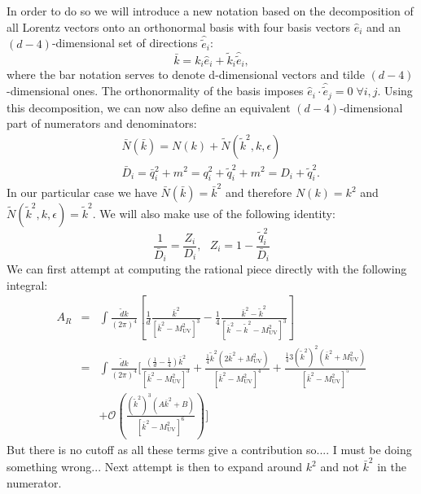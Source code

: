 \documentclass[11pt]{article}
\begin{document}
In order to do so we will introduce a new notation based on the decomposition of all Lorentz vectors onto an orthonormal basis with four basis vectors $\hat{e}_i$ and an $(d-4)$-dimensional set of directions $\hat{\tilde{e}}_i$:
\begin{equation}
\bar{k} = k_i \hat{e}_i + \tilde{k}_i \hat{\tilde{e}}_i,
\end{equation}
where the bar notation serves to denote d-dimensional vectors and tilde $(d-4)$-dimensional ones. 
The orthonormality of the basis imposes $\hat{e}_i \cdot \hat{\tilde{e}}_j = 0\; \forall i,j$.
Using this decomposition, we can now also define an equivalent $(d-4)$-dimensional part of numerators and denominators:
\begin{eqnarray}
&&\bar{N}(\bar{k})=N(k)+\tilde{N}(\tilde{k}^2,k,\epsilon) \nonumber\\
&&\bar{D}_i = \bar{q}_i^2+m^2 = q_i^2+\tilde{q}_i^2+m^2 = D_i + \tilde{q}_i^2.
\end{eqnarray}
In our particular case we have $\bar{N}(\bar{k})=\bar{k}^2$ and therefore $N(k)=k^2$ and $\tilde{N}(\tilde{k}^2,k,\epsilon)=\tilde{k}^2$.
We will also make use of the following identity:
\begin{equation}
\frac{1}{\bar{D}_i}=\frac{Z_i}{D_i},\textrm{  } Z_i=1-\frac{\tilde{q}_i^2}{\bar{D}_i}
\end{equation}
We can first attempt at computing the rational piece directly with the following integral:
\begin{eqnarray}
A_{R} &=& \int \frac{\tilde{d} k}{(2\pi)^4} \left [
\frac{1}{d} \frac{ \bar{k}^2 }{\left[ \bar{k}^2-M_\textrm{UV}^2\right]^3}
-\frac{1}{4} \frac{ \bar{k}^2-\tilde{k}^2  }{\left[ \bar{k}^2-\tilde{k}^2-M_\textrm{UV}^2\right]^3}
\right] \nonumber\\
&=& \int \frac{\tilde{d} k}{(2\pi)^4}
{\Big[} 
\frac{\left(\frac{1}{d}-\frac{1}{4}\right)\bar{k}^2}
{\left[ \bar{k}^2-M_\textrm{UV}^2\right]^3}
+\frac{\frac{1}{4}\tilde{k}^2\left(2\bar{k}^2 +M_\textrm{UV}^2 \right)
}{\left[ \bar{k}^2-M_\textrm{UV}^2\right]^4} 
+\frac{\frac{1}{4}3(\tilde{k}^2)^2\left(\bar{k}^2 +M_\textrm{UV}^2 \right)
}{\left[ \bar{k}^2-M_\textrm{UV}^2\right]^5} \nonumber\\
&&+\mathcal{O}\left(\frac{(\tilde{k}^2)^3(A\bar{k}^2+B)}{\left[ \bar{k}^2-M_\textrm{UV}^2\right]^6}\right)
{\Big]}
\end{eqnarray}
But there is no cutoff as all these terms give a contribution so.... I must be doing something wrong...
Next attempt is then to expand around $k^2$ and not $\bar{k}^2$ in the numerator.
\end{document}

